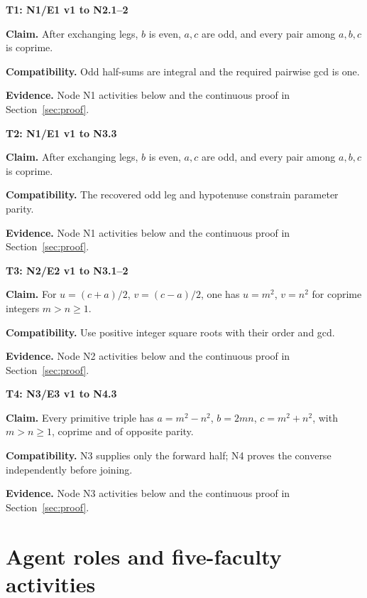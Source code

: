 \documentclass[preprint,12pt,aps,pra,showkeys,amsmath,amssymb,superscriptaddress,floatfix]{revtex4-2}
\theoremstyle{definition}
\theoremstyle{remark}
\newcommand{\field}[2]{\par\smallskip\noindent\textbf{#1.} #2\par}
\begin{document}
\begingroup\small\linespread{1.05}\selectfont\renewcommand{\field}[2]{\par\noindent\textbf{#1.} #2\par}

\smallskip\noindent\textbf{T1: N1/E1 v1 to N2.1–2}

\field{Claim}{After exchanging legs, \(b\) is even, \(a,c\) are odd, and every pair
among \(a,b,c\) is coprime.}

\field{Compatibility}{Odd half-sums are integral and the required pairwise gcd is one.}

\field{Evidence}{Node N1 activities below and the continuous proof in Section~\ref{sec:proof}.}

\smallskip\noindent\textbf{T2: N1/E1 v1 to N3.3}

\field{Claim}{After exchanging legs, \(b\) is even, \(a,c\) are odd, and every pair
among \(a,b,c\) is coprime.}

\field{Compatibility}{The recovered odd leg and hypotenuse constrain parameter parity.}

\field{Evidence}{Node N1 activities below and the continuous proof in Section~\ref{sec:proof}.}

\smallskip\noindent\textbf{T3: N2/E2 v1 to N3.1–2}

\field{Claim}{For \(u=(c+a)/2\), \(v=(c-a)/2\), one has \(u=m^2\), \(v=n^2\) for
coprime integers \(m>n\ge1\).}

\field{Compatibility}{Use positive integer square roots with their order and gcd.}

\field{Evidence}{Node N2 activities below and the continuous proof in Section~\ref{sec:proof}.}

\smallskip\noindent\textbf{T4: N3/E3 v1 to N4.3}

\field{Claim}{Every primitive triple has \(a=m^2-n^2\), \(b=2mn\), \(c=m^2+n^2\), with
\(m>n\ge1\), coprime and of opposite parity.}

\field{Compatibility}{N3 supplies only the forward half; N4 proves the converse independently
before joining.}

\field{Evidence}{Node N3 activities below and the continuous proof in Section~\ref{sec:proof}.}

\endgroup

\clearpage\section{Agent roles and five-faculty activities}
\end{document}
